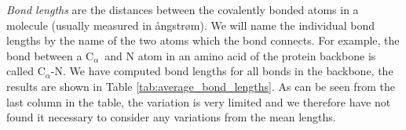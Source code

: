 \documentclass[a0,portrait]{a0poster}
\newcommand{\Ca}{C$_{\alpha}${}}
\begin{document}
\begin{GridBlock}{0}{72.3}{48}

\textit{Bond lengths} are the distances between the covalently bonded atoms
in a molecule (usually measured in ångstrøm). We will name the
individual bond lengths by the name of the two atoms which the bond
connects. For example, the bond between a \Ca\ and N atom in an amino acid of
the protein backbone is called \Ca -N. We have computed bond lengths
for all bonds in the backbone, the results are shown in Table
\ref{tab:average_bond_lengths}. As can be seen from the last column in
the table, the variation is very limited and we therefore have not
found it necessary to consider any variations from the mean
lengths.
\end{GridBlock}

\begin{GridBlock}{51}{72.3}{48}
\begin{multicols}{2}
\vspace{-4mm}
\end{multicols}
\end{GridBlock}
\end{document}
